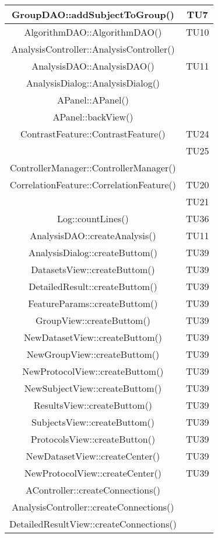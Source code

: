 \begin{center}
\begin{longtable}{|c|c|}
\hline 
GroupDAO::addSubjectToGroup() & TU7 \\
\hline 
AlgorithmDAO::AlgorithmDAO() & TU10 \\
\hline 
AnalysisController::AnalysisController() &  \\
\hline 
AnalysisDAO::AnalysisDAO() & TU11 \\
\hline 
AnalysisDialog::AnalysisDialog() &  \\
\hline 
APanel::APanel() &  \\
\hline 
APanel::backView() &  \\
\hline 
ContrastFeature::ContrastFeature() & TU24 \\
 & TU25 \\
\hline 
ControllerManager::ControllerManager() &  \\
\hline 
CorrelationFeature::CorrelationFeature() & TU20 \\
 & TU21 \\
\hline 
Log::countLines() & TU36 \\
\hline 
AnalysisDAO::createAnalysis() & TU11 \\
\hline 
AnalysisDialog::createButtom() & TU39 \\
\hline 
DatasetsView::createButtom() & TU39 \\
\hline 
DetailedResult::createButtom() & TU39 \\
\hline 
FeatureParams::createButtom() & TU39 \\
\hline 
GroupView::createButtom() & TU39 \\
\hline 
NewDatasetView::createButtom() & TU39 \\
\hline 
NewGroupView::createButtom() & TU39 \\
\hline 
NewProtocolView::createButtom() & TU39 \\
\hline 
NewSubjectView::createButtom() & TU39 \\
\hline 
ResultsView::createButtom() & TU39 \\
\hline 
SubjectsView::createButtom() & TU39 \\
\hline 
ProtocolsView::createButton() & TU39 \\
\hline 
NewDatasetView::createCenter() & TU39 \\
\hline 
NewProtocolView::createCenter() & TU39 \\
\hline 
AController::createConnections() &  \\
\hline 
AnalysisController::createConnections() &  \\
\hline 
DetailedResultView::createConnections() &  \\

\end{longtable}
\end{center}
